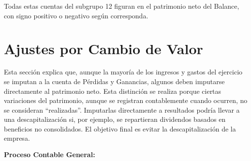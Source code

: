 \documentclass[
  paper=a4,
  ,captions=tableheading
]{scrbook}
\begin{document}
Todas estas cuentas del subgrupo 12 figuran en el patrimonio neto del
Balance, con signo positivo o negativo según corresponda.

\hypertarget{ajustes-por-cambio-de-valor}{%
\section{Ajustes por Cambio de
Valor}\label{ajustes-por-cambio-de-valor}}

Esta sección explica que, aunque la mayoría de los ingresos y gastos del
ejercicio se imputan a la cuenta de Pérdidas y Ganancias, algunos deben
imputarse directamente al patrimonio neto. Esta distinción se realiza
porque ciertas variaciones del patrimonio, aunque se registran
contablemente cuando ocurren, no se consideran ``realizadas''.
Imputarlas directamente a resultados podría llevar a una
descapitalización si, por ejemplo, se repartieran dividendos basados en
beneficios no consolidados. El objetivo final es evitar la
descapitalización de la empresa.

\textbf{Proceso Contable General:}
\end{document}
